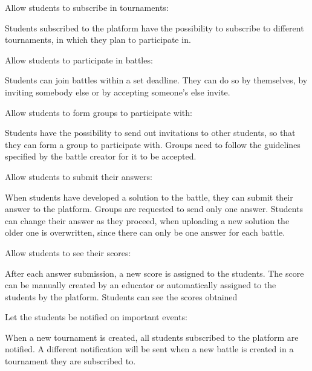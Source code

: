 \documentclass{article}
\begin{document}
\begin{description}
    \item[G5:] Allow students to subscribe in tournaments:
        \item Students subscribed to the platform have the possibility to subscribe to different tournaments, in which they plan to participate in.
    \item[G6:] Allow students to participate in battles:
        \item Students can join battles within a set deadline. They can do so by themselves, by inviting somebody else or by accepting someone's else invite.
        \begin{description}
            \item[G6.1:] Allow students to form groups to participate with:
                \item Students have the possibility to send out invitations to other students, so that they can form a group to participate with. Groups need to follow the guidelines specified by the battle creator for it to be accepted.
            \item[G6.2:] Allow students to submit their answers:
                \item When students have developed a solution to the battle, they can submit their answer to the platform. Groups are requested to send only one answer. Students can change their answer as they proceed, when uploading a new solution the older one is overwritten, since there can only be one answer for each battle. 
            \item[G6.2:] Allow students to see their scores:
                \item After each answer submission, a new score is assigned to the students. The score can be manually created by an educator or automatically assigned to the students by the platform. Students can see the scores obtained  %
        \end{description}
        \item[G7:] Let the students be notified on important events:
            \item When a new tournament is created, all students subscribed to the platform are notified. A different notification will be sent when a new battle is created in a tournament they are subscribed to.
\end{description}
\end{document}
